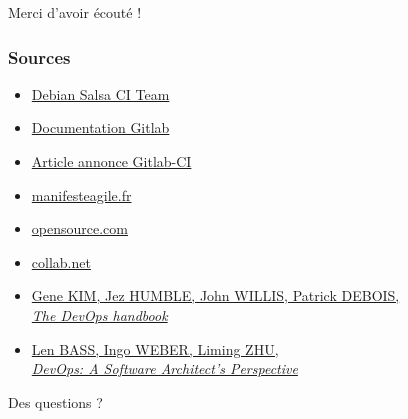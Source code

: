 \documentclass[10pt]{beamer}
\begin{document}
	\begin{appendix}

		\begin{frame}[standout]
			Merci d'avoir écouté !
		\end{frame}

		\begin{frame}
			\frametitle{Sources}
			\begin{itemize}
				\item \href{https://salsa.debian.org/salsa-ci-team/pipeline}{Debian Salsa CI Team}
				\item \href{https://docs.gitlab.com/ee/ci/}{Documentation Gitlab}

				\item \href{https://about.gitlab.com/press/releases/2018-03-22-gitlab-cicd-github-integration.html}{Article annonce Gitlab-CI}
				\item \href{http://manifesteagile.fr/}{manifesteagile.fr}
				\item \href{https://opensource.com/article/17/11/5-keys-get-started-devops}{opensource.com}
				\item \href{https://resources.collab.net/devops-101/what-is-devops}{collab.net}

				\item \href{https://itrevolution.com/book/the-devops-handbook/}{Gene KIM, Jez HUMBLE, John WILLIS, Patrick DEBOIS,\\ \textit{The DevOps handbook}}
				\item \href{https://itrevolution.com/book/the-devops-handbook/}{Len BASS, Ingo WEBER, Liming ZHU,\\ \textit{DevOps: A Software Architect’s Perspective}}
			\end{itemize}
		\end{frame}

		\begin{frame}[standout]
			Des questions ?
		\end{frame}

	\end{appendix}
	\maketitle
\end{document}
